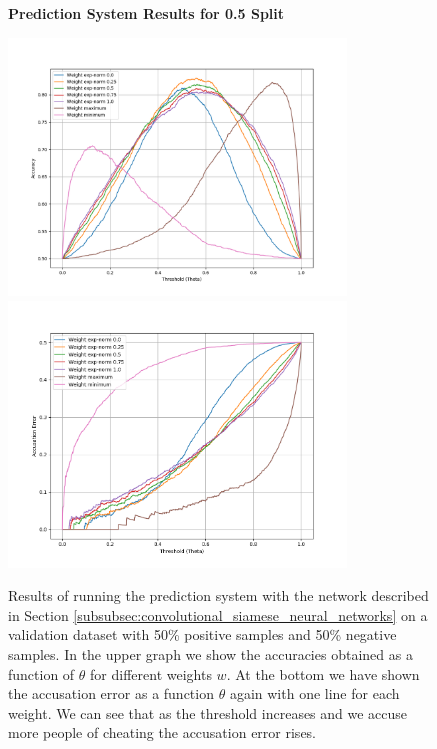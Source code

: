 \begin{figure}
    \centering
    \textbf{Prediction System Results for 0.5 Split}\par\medskip
    \includegraphics[width=0.8\textwidth]{./pictures/experiments/network6_prediction_system_accuracies.png}
    \includegraphics[width=0.8\textwidth]{./pictures/experiments/network6_prediction_system_accusation_error.png}
    \caption{Results of running the prediction system with the network described
        in Section \ref{subsubsec:convolutional_siamese_neural_networks} on a
        validation dataset with 50\% positive samples and 50\% negative samples.
        In the upper graph we show the accuracies obtained as a function of
        $\theta$ for different weights $w$. At the bottom we have shown the
        accusation error as a function $\theta$ again with one line for each
        weight. We can see that as the threshold increases and we accuse more
        people of cheating the accusation error rises.}
    \label{fig:prediction_system_results_3}
\end{figure}

